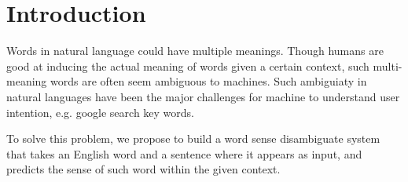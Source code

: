 \section{Introduction}

% 
Words in natural language could have multiple meanings. Though humans are good
at inducing the actual meaning of words given a certain context, such
multi-meaning words are often seem ambiguous to machines. Such ambiguiaty in
natural languages have been the major challenges for machine to understand user
intention, e.g. google search key words.

To solve this problem, we propose to build a word sense disambiguate system that
takes an English word and a sentence where it appears as input, and predicts the
sense of such word within the given context. 
